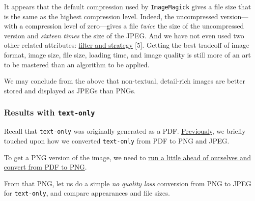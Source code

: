 \documentclass[
  11pt,
  british,
  a4paper,
]{article}
\begin{document}
It appears that the default compression used by \texttt{ImageMagick}
gives a file size that is the same as the highest compression level.
Indeed, the uncompressed version---with a compression level of
zero---gives a file \emph{twice} the size of the uncompressed version
and \emph{sixteen times} the size of the JPEG. And we have not even used
two other related attributes:
\href{https://stackoverflow.com/questions/27267073/imagemagick-lossless-max-compression-for-png}{filter
and strategy} {[}5{]}. Getting the best tradeoff of image format, image
size, file size, loading time, and image quality is still more of an art
to be mastered than an algorithm to be applied.

We may conclude from the above that non-textual, detail-rich images are
better stored and displayed as JPEGs than PNGs.

\hypertarget{results-with-text-only}{%
\subsubsection{\texorpdfstring{Results with
\texttt{text-only}}{Results with text-only}}\label{results-with-text-only}}

Recall that \texttt{text-only} was originally generated as a PDF.
\protect\hyperlink{converting-text-only-from-pdf-to-png-and-jpeg}{Previously},
we briefly touched upon how we converted \texttt{text-only} from PDF to
PNG and JPEG.

To get a PNG version of the image, we need to
\protect\hyperlink{pdf-to-png-and-jpeg-poppler-and-cairo}{run a little
ahead of ourselves and convert from PDF to PNG}.

From that PNG, let us do a simple \emph{no quality loss} conversion from
PNG to JPEG for \texttt{text-only}, and compare appearances and file
sizes.
\end{document}
